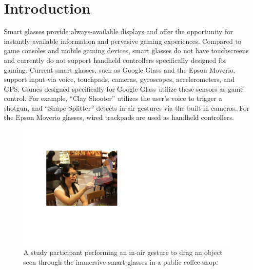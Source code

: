 \documentclass{sigchi}
\begin{document}
\section{Introduction}

Smart glasses provide always-available displays and offer the opportunity for instantly available information and pervasive gaming experiences. 
Compared to game consoles and mobile gaming devices, smart glasses do not have touchscreens and currently do not support handheld controllers specifically designed for gaming.
Current smart glasses, such as Google Glass and the Epson Moverio, support input via voice, touchpads, cameras, gyroscopes, accelerometers, and GPS.
Games designed specifically for Google Glass \cite{MiniGames} utilize these sensors as game control. 
For example, ``Clay Shooter'' utilizes the user's voice to trigger a shotgun, and ``Shape Splitter'' detects in-air gestures via the built-in cameras. 
For the Epson Moverio glasses, wired trackpads are used as handheld controllers.


 \begin{figure}[!t]
  \centering
  \includegraphics[width=1\columnwidth]{TopFigure2.pdf}
  \caption{A study participant performing an in-air gesture to drag an object seen through the immersive smart glasses in a public coffee shop.}
  \label{fig:TopFigure}
  \end{figure} 
\end{document}
